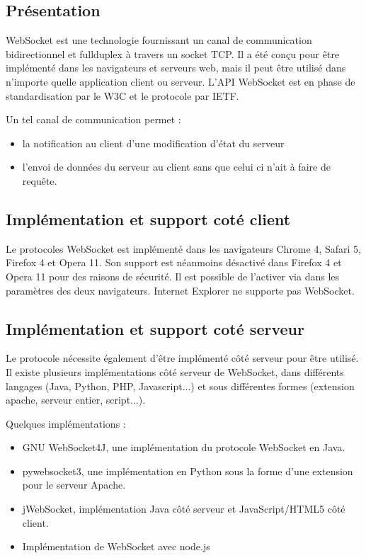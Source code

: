 \documentclass[a4paper,10pt]{report}
\begin{document}
    \subsection{Présentation}

WebSocket est une technologie fournissant un canal de communication bidirectionnel 
et fullduplex à travers un socket TCP. Il a été conçu pour être implémenté dans 
les navigateurs et serveurs web, mais il peut être utilisé dans n'importe quelle 
application client ou serveur. L'API WebSocket est en phase de standardisation 
par le W3C et le protocole par IETF.

Un tel canal de communication permet :

\begin{itemize}
  \item la notification au client d'une modification d'état du serveur
  \item l'envoi de données du serveur au client sans que celui ci n'ait à faire de requête.
\end{itemize}

    \subsection{Implémentation et support coté client}

Le protocoles WebSocket est implémenté dans les navigateurs Chrome 4, Safari 5, 
Firefox 4 et Opera 11. Son support est néanmoins désactivé dans Firefox 4 et 
Opera 11 pour des raisons de sécurité. Il est possible de l'activer via dans les 
paramètres des deux navigateurs. Internet Explorer ne supporte pas WebSocket.


    \subsection{Implémentation et support coté serveur}

Le protocole nécessite également d'être implémenté côté serveur pour être 
utilisé. Il existe plusieurs implémentations côté serveur de WebSocket, 
dans différents langages (Java, Python, PHP, Javascript...) et sous 
différentes formes (extension apache, serveur entier, script...).

Quelques implémentations :

\begin{itemize}
  \item GNU WebSocket4J, une implémentation du protocole WebSocket en Java. 
  \item pywebsocket3, une implémentation en Python sous la forme d'une extension pour le serveur Apache.
  \item jWebSocket, implémentation Java côté serveur et JavaScript/HTML5 côté client.
  \item Implémentation de WebSocket avec node.js
\end{itemize}
\end{document}
